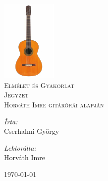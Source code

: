 \begin{titlepage}
\begin{center}

\vspace*{1cm}
\HRule \\
\vspace*{1.5cm}
\includegraphics[width=0.20\textwidth]{./images/guitar.pdf}~\\
\vspace*{3cm}
\textsc{\LARGE Elmélet és Gyakorlat}\\[0.5cm]
\textsc{\LARGE Jegyzet}\\[0.5cm]
\textsc{\LARGE Horváth Imre gitárórái alapján}\\
\vspace*{5cm}
\begin{minipage}{0.4\textwidth}
\begin{flushleft} \large
\emph{Írta:}\\
Cserhalmi György
\end{flushleft}
\end{minipage}
\begin{minipage}{0.4\textwidth}
\begin{flushright} \large
\emph{Lektorálta:} \\
Horváth Imre
\end{flushright}
\end{minipage}
\vfill
{\large \today}
\HRule \\

\end{center}
\end{titlepage}